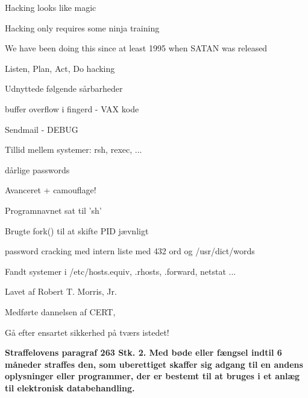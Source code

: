 \documentclass[Screen16to9,17pt]{foils}
\begin{document}
\centerline{Hacking looks like magic}




\begin{list2}
\item Hacking only requires some ninja training
\item We have been doing this since at least 1995 when SATAN was released
\item Listen, Plan, Act, Do hacking
\end{list2}


\begin{list1}
\item Udnyttede følgende sårbarheder
\begin{list2}
\item buffer overflow i fingerd - VAX kode
\item  Sendmail - DEBUG
\item Tillid mellem systemer: rsh, rexec, ...
\item dårlige passwords
\end{list2}
\item Avanceret + camouflage!
\begin{list2}
\item Programnavnet sat til 'sh'
\item Brugte fork() til at skifte PID jævnligt
\item password cracking med intern liste med 432 ord og /usr/dict/words
\item Fandt systemer i /etc/hosts.equiv, .rhosts, .forward, netstat ...
\end{list2}
\item Lavet af Robert T. Morris, Jr.
\item Medførte dannelsen af CERT, 
\end{list1}




{\hskip 65mm Gå efter ensartet sikkerhed på tværs istedet!}





{\bfseries Straffelovens paragraf 263 Stk. 2. Med bøde eller fængsel
  indtil 6 måneder
straffes den, som uberettiget skaffer sig adgang til en andens
oplysninger eller programmer, der er bestemt til at bruges i et anlæg
til elektronisk databehandling.}
\end{document}
